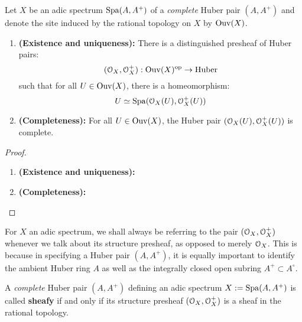                     \begin{proposition} \label{prop: structure_presheaves_of_adic_spectra}
                        Let $X$ be an adic spectrum $\mathrm{Spa}(A, A^+)$ of a \textit{complete} Huber pair $(A, A^+)$ and denote the site induced by the rational topology on $X$ by $\mathrm{Ouv}(X)$. 
                            \begin{enumerate}
                                \item \textbf{(Existence and uniqueness):} There is a distinguished presheaf of Huber pairs:
                                    $$(\mathcal{O}_X, \mathcal{O}_X^+): \mathrm{Ouv}(X)^{\mathrm{op}} \to \mathrm{Huber}$$
                                such that for all $U \in \mathrm{Ouv}(X)$, there is a homeomorphism:
                                    $$U \simeq \mathrm{Spa}(\mathcal{O}_X(U), \mathcal{O}_X^+(U))$$
                                \item \textbf{(Completeness):} For all $U \in \mathrm{Ouv}(X)$, the Huber pair $(\mathcal{O}_X(U), \mathcal{O}_X^+(U))$ is complete.
                            \end{enumerate}
                    \end{proposition} 
                        \begin{proof}
                            \noindent
                            \begin{enumerate}
                                \item \textbf{(Existence and uniqueness):}
                                \item \textbf{(Completeness):}
                            \end{enumerate}
                        \end{proof}
                    \begin{convention}
                        For $X$ an adic spectrum, we shall always be referring to the pair $(\mathcal{O}_X, \mathcal{O}_X^+)$ whenever we talk about its structure presheaf, as opposed to merely $\mathcal{O}_X$. This is because in specifying a Huber pair $(A, A^+)$, it is equally important to identify the ambient Huber ring $A$ as well as the integrally closed open subring $A^+ \subset A^{\circ}$.
                    \end{convention}
                    \begin{definition}[Sheafiness] \label{def: sheafiness}
                        A \textit{complete} Huber pair $(A, A^+)$ defining an adic spectrum $X := \mathrm{Spa}(A, A^+)$ is called \textbf{sheafy} if and only if its structure presheaf $(\mathcal{O}_X, \mathcal{O}_X^+)$ is a sheaf in the rational topology.
                    \end{definition}
                    
